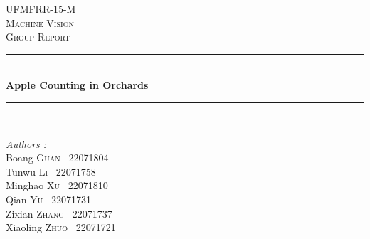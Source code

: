 \begin{titlepage}
\linespread{1.0} %
\setlength{\parskip}{0pt} %
\newcommand{\HRule}{\rule{\linewidth}{0.1mm}} 
\center %
 
\textsc{\Large UFMFRR-15-M}\\[0.5cm] %
\textsc{\Large Machine Vision}\\[0.5cm] %
\textsc{\large Group Report}\\[0.5cm] %

\HRule \\[0.4cm]
{ \huge \bfseries Apple Counting in Orchards}\\[0.1cm] %
\HRule \\[1.5cm]
 

\begin{minipage}{0.4\textwidth}
\begin{flushleft} \large

\emph{Authors :}\\ \vspace{0.5em}
Boang \textsc{Guan} \ 22071804 \\ \vspace{0.5em}
Tunwu \textsc{Li} \ 22071758 \\ \vspace{0.5em}
Minghao \textsc{Xu} \ 22071810 \\ \vspace{0.5em}
Qian \textsc{Yu} \ 22071731 \\ \vspace{0.5em}
Zixian \textsc{Zhang} \ 22071737 \\ \vspace{0.5em}
Xiaoling \textsc{Zhuo} \ 22071721 \\ \vspace{0.5em}




\end{flushleft}
\end{minipage}
\end{titlepage}
